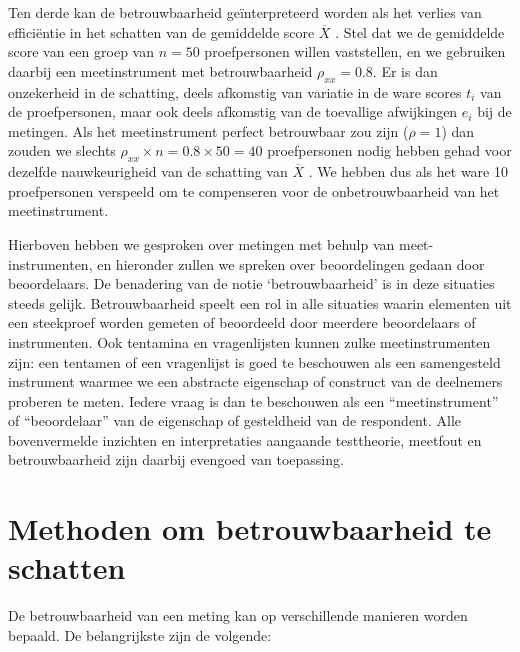 \documentclass[
]{book}
\begin{document}
Ten derde kan de betrouwbaarheid geïnterpreteerd worden als het verlies
van efficiëntie in het schatten van de gemiddelde score \(\overline{X}\)
\citep[ p.474]{Ferg89}. Stel dat we de gemiddelde score van een groep van
\(n=50\) proefpersonen willen vaststellen, en we gebruiken daarbij een
meetinstrument met betrouwbaarheid \(\rho_{xx}=0.8\). Er is dan
onzekerheid in de schatting, deels afkomstig van variatie in de ware
scores \(t_i\) van de proefpersonen, maar ook deels afkomstig van de
toevallige afwijkingen \(e_i\) bij de metingen. Als het meetinstrument
perfect betrouwbaar zou zijn (\(\rho=1\)) dan zouden we slechts
\(\rho_{xx}\times n = 0.8\times50=40\) proefpersonen nodig hebben gehad
voor dezelfde nauwkeurigheid van de schatting van \(\overline{X}\)
\citep[ p.474]{Ferg89}. We hebben dus als het ware 10 proefpersonen verspeeld
om te compenseren voor de onbetrouwbaarheid van het meetinstrument.

Hierboven hebben we gesproken over metingen met behulp van
meet-instrumenten, en hieronder zullen we spreken over beoordelingen
gedaan door beoordelaars. De benadering van de notie `betrouwbaarheid'
is in deze situaties steeds gelijk. Betrouwbaarheid speelt een rol in
alle situaties waarin elementen uit een steekproef worden gemeten of
beoordeeld door meerdere beoordelaars of instrumenten. Ook tentamina en
vragenlijsten kunnen zulke meetinstrumenten zijn: een tentamen of een
vragenlijst is goed te beschouwen als een samengesteld instrument
waarmee we een abstracte eigenschap of construct van de deelnemers
proberen te meten. Iedere vraag is dan te beschouwen als een
``meetinstrument'' of ``beoordelaar'' van de eigenschap of gesteldheid van
de respondent. Alle bovenvermelde inzichten en interpretaties aangaande
testtheorie, meetfout en betrouwbaarheid zijn daarbij evengoed van
toepassing.

\section{Methoden om betrouwbaarheid te schatten}\label{methoden-om-betrouwbaarheid-te-schatten}

De betrouwbaarheid van een meting kan op verschillende manieren worden
bepaald. De belangrijkste zijn de volgende:
\end{document}
